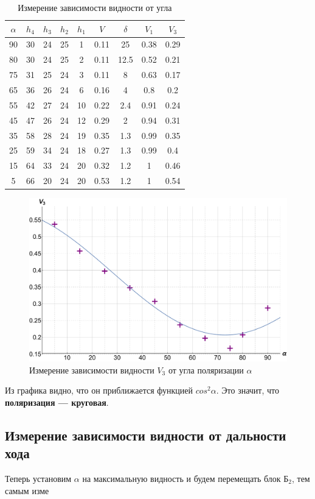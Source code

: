 \documentclass[12pt]{kiarticle}
\begin{document}
	\begin{table}[h!]
	\caption{Измерение зависимости видности от угла}
	\begin{center}
		\begin{tabular}{|c|c|c|c|c|c|c|c|c|}
			\hline
	$ 	\alpha  $ & $ h_4 $ &  $ h_3 $& $ h_2 $ & $ h_1 $ & $ V $ & $  \delta  $ & $ V_1 $ & $ V_3 $ \\
		\hline
		90 & 30 & 24 & 25 & 1 & 0.11 & 25 & 0.38 & 0.29 \\
		80 & 30 & 24 & 25 & 2 & 0.11 & 12.5 & 0.52 & 0.21 \\
		75 & 31 & 25 & 24 & 3 & 0.11 & 8 & 0.63 & 0.17 \\
		65 & 36 & 26 & 24 & 6 & 0.16 & 4 & 0.8 & 0.2 \\
		55 & 42 & 27 & 24 & 10 & 0.22 & 2.4 & 0.91 & 0.24 \\
		45 & 47 & 26 & 24 & 12 & 0.29 & 2 & 0.94 & 0.31 \\
		35 & 58 & 28 & 24 & 19 & 0.35 & 1.3 & 0.99 & 0.35 \\
		25 & 59 & 34 & 24 & 18 & 0.27 & 1.3 & 0.99 & 0.4 \\
		15 & 64 & 33 & 24 & 20 & 0.32 & 1.2 & 1 & 0.46 \\
		5 & 66 & 20 & 24 & 20 & 0.53 & 1.2 & 1 & 0.54 \\
			\hline
		\end{tabular}
	\end{center}
	\label{table_v3}
\end{table}

		\begin{figure}[h!]
	\label{graf_v3}
	\includegraphics[scale=0.47]{v3.pdf}
	\caption{Измерение зависимости видности $ V_3 $ от угла поляризации $ \alpha $}
\end{figure}

Из графика видно, что он приближается функцией $ cos^2 \alpha $. Это значит, что \textbf{поляризация --- круговая}.

\subsection{Измерение зависимости видности от дальности хода}

Теперь установим $ \alpha $ на максимальную видность и будем перемещать блок $ Б_2 $, тем самым изме

	
	
\end{document}
